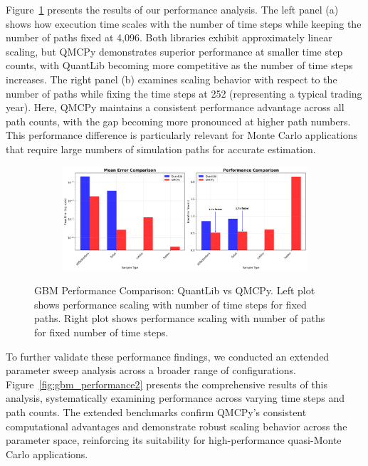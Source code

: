 Figure~\ref{fig:gbm_performance} presents the results of our performance analysis. The left panel (a) shows how execution time scales with the number of time steps while keeping the number of paths fixed at 4,096. Both libraries exhibit approximately linear scaling, but QMCPy demonstrates superior performance at smaller time step counts, with QuantLib becoming more competitive as the number of time steps increases. The right panel (b) examines scaling behavior with respect to the number of paths while fixing the time steps at 252 (representing a typical trading year). Here, QMCPy maintains a consistent performance advantage across all path counts, with the gap becoming more pronounced at higher path numbers. This performance difference is particularly relevant for Monte Carlo applications that require large numbers of simulation paths for accurate estimation.

\begin{figure}[H]
    \centering
    \begin{subfigure}{1\textwidth}
        \centering
        \includegraphics[width=\textwidth]{GBM/images/figure_6.png}
    \end{subfigure}
    \caption{GBM Performance Comparison: QuantLib vs QMCPy. Left plot shows performance scaling with number of time steps for fixed paths. Right plot shows performance scaling with number of paths for fixed number of time steps.}
    \label{fig:gbm_performance}
\end{figure}

To further validate these performance findings, we conducted an extended parameter sweep analysis across a broader range of configurations. Figure~\ref{fig:gbm_performance2} presents the comprehensive results of this analysis, systematically examining performance across varying time steps and path counts. The extended benchmarks confirm QMCPy's consistent computational advantages and demonstrate robust scaling behavior across the parameter space, reinforcing its suitability for high-performance quasi-Monte Carlo applications.

